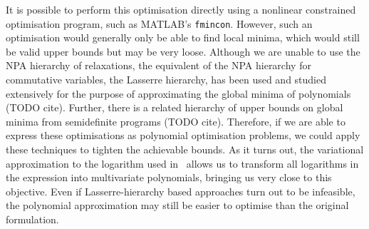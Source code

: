 \documentclass[10pt, a4paper]{article}
\numberwithin{equation}{section} %
\theoremstyle{definition}
\theoremstyle{plain}
\newcommand{\?}{\mathrel{?}} %
\begin{document}
    It is possible to perform this optimisation directly using a nonlinear constrained optimisation program, such as MATLAB's \verb`fmincon`. However, such an optimisation would generally only be able to find local minima, which would still be valid upper bounds but may be very loose. Although we are unable to use the NPA hierarchy of relaxations, the equivalent of the NPA hierarchy for commutative variables, the Lasserre hierarchy, has been used and studied extensively for the purpose of approximating the global minima of polynomials (TODO cite). Further, there is a related hierarchy of upper bounds on global minima from semidefinite programs (TODO cite). Therefore, if we are able to express these optimisations as polynomial optimisation problems, we could apply these techniques to tighten the achievable bounds. As it turns out, the variational approximation to the logarithm used in~\cite{BFF_QRE} allows us to transform all logarithms in the expression into multivariate polynomials, bringing us very close to this objective. Even if Lasserre-hierarchy based approaches turn out to be infeasible, the polynomial approximation may still be easier to optimise than the original formulation.
\end{document}
